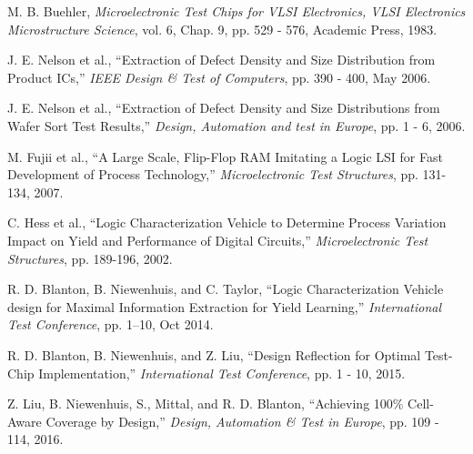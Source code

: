 \documentclass[journal]{IEEEtran}
\begin{document}
%
%
%
\begin{thebibliography}{1}

	M. B. Buehler, \emph{Microelectronic Test Chips for VLSI Electronics, VLSI Electronics Microstructure Science}, vol. 6, Chap. 9, pp. 529 - 576, Academic Press, 1983.
	
	J. E. Nelson et al., ``Extraction of Defect Density and Size Distribution from Product ICs,'' \emph{IEEE Design \& Test of Computers}, pp. 390 - 400, May 2006.
	
	J. E. Nelson et al., ``Extraction of Defect Density and Size Distributions from Wafer Sort Test Results,'' \emph{Design, Automation and test in Europe}, pp. 1 - 6, 2006.
	
	
	M. Fujii et al., ``A Large Scale, Flip-Flop RAM Imitating a Logic LSI for Fast Development of 	Process Technology,'' \emph{Microelectronic Test Structures}, pp. 131-134, 2007.
	
	C. Hess et al., ``Logic Characterization Vehicle to Determine Process Variation Impact on Yield and Performance of Digital Circuits,'' \emph{Microelectronic Test Structures}, pp. 189-196, 2002.
	
	R. D. Blanton, B. Niewenhuis, and C. Taylor, ``Logic Characterization Vehicle design for Maximal Information Extraction for Yield Learning,'' \emph{International Test Conference}, pp. 1–10, Oct 2014.
	
	R. D. Blanton, B. Niewenhuis, and Z. Liu, ``Design Reflection for Optimal Test-Chip Implementation,'' \emph{International Test Conference}, pp. 1 - 10, 2015.
	
	Z. Liu, B. Niewenhuis, S., Mittal, and R. D. Blanton, ``Achieving 100\% Cell-Aware Coverage by Design,'' \emph{Design, Automation \& Test in Europe}, pp. 109 - 114, 2016.
	

\end{thebibliography}
\end{document}
